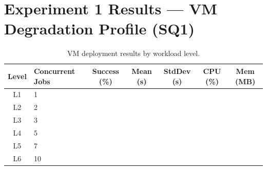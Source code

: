 
\section{Experiment 1 Results --- VM Degradation Profile (SQ1)}
\label{sec:results-exp1}


\begin{table}[H]
  \centering
  \caption{VM deployment results by workload level.}
  \label{tab:results-vm}
  \small
  \begin{tabular}{clccccc}
    \toprule
    \textbf{Level} & \textbf{Concurrent Jobs} & \textbf{Success (\%)} & \textbf{Mean (s)} & \textbf{StdDev (s)} & \textbf{CPU (\%)} & \textbf{Mem (MB)} \\
    \midrule
    L1 & 1  & & & & & \\
    L2 & 2  & & & & & \\
    L3 & 3  & & & & & \\
    L4 & 5  & & & & & \\
    L5 & 7  & & & & & \\
    L6 & 10 & & & & & \\
    \bottomrule
  \end{tabular}
\end{table}


